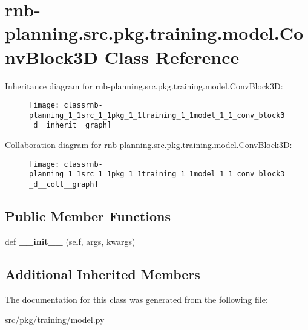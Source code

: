 \hypertarget{classrnb-planning_1_1src_1_1pkg_1_1training_1_1model_1_1_conv_block3_d}{}\section{rnb-\/planning.src.\+pkg.\+training.\+model.\+Conv\+Block3D Class Reference}
\label{classrnb-planning_1_1src_1_1pkg_1_1training_1_1model_1_1_conv_block3_d}


Inheritance diagram for rnb-\/planning.src.\+pkg.\+training.\+model.\+Conv\+Block3D\+:
\nopagebreak
\begin{figure}[H]
\begin{center}
\leavevmode
\texttt{[image: classrnb-planning\_1\_1src\_1\_1pkg\_1\_1training\_1\_1model\_1\_1\_conv\_block3\_d\_\_inherit\_\_graph]}
\end{center}
\end{figure}


Collaboration diagram for rnb-\/planning.src.\+pkg.\+training.\+model.\+Conv\+Block3D\+:
\nopagebreak
\begin{figure}[H]
\begin{center}
\leavevmode
\texttt{[image: classrnb-planning\_1\_1src\_1\_1pkg\_1\_1training\_1\_1model\_1\_1\_conv\_block3\_d\_\_coll\_\_graph]}
\end{center}
\end{figure}
\subsection*{Public Member Functions}
\begin{DoxyCompactItemize}
\item 
\mbox{\label{classrnb-planning_1_1src_1_1pkg_1_1training_1_1model_1_1_conv_block3_d_aaf5bc71054db30a52e4771ded9edf1be}} 
def {\bfseries \+\_\+\+\_\+init\+\_\+\+\_\+} (self, args, kwargs)
\end{DoxyCompactItemize}
\subsection*{Additional Inherited Members}


The documentation for this class was generated from the following file\+:\begin{DoxyCompactItemize}
\item 
src/pkg/training/model.\+py\end{DoxyCompactItemize}
